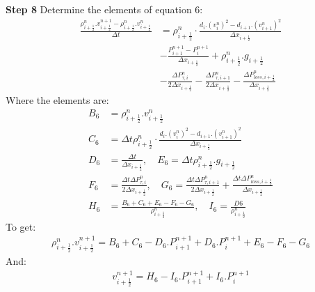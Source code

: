 \documentclass[11pt,letterpaper,titlepage]{article}
\newcommand{\half}{\frac{1}{2}}
\begin{document}
\newpage \noindent
\textbf{Step 8}\newline
Determine the elements of equation 6:
\begin{equation*}
\begin{aligned}
 \frac{\rho_{i+\half}^{n}.v_{i+\half}^{n+1}-\rho_{i+\half}^n.v_{i+\half}^n}{\Delta t} &= \rho_{i+\half}^n\cdot\frac{d_i.(v_{i}^n)^2-d_{i+1}.(v_{i+1}^n)^2}{\Delta x_{i+\half}}     \\
&-\frac{P_{i+1}^{n+1}-P_i^{n+1}}{\Delta x_{i+\half}} +\rho_{i+\half}^n.g_{i+\half} \\
&-\frac{\Delta P_{\tau,i}^n }{2\Delta x_{i+\half}}- \frac{\Delta P_{\tau,i+1}^n }{2\Delta x_{i+\half}} -\frac{\Delta P_{loss,i+\half}^n}{\Delta x_{i+\half}}
\end{aligned}
\end{equation*}
\newline
Where the elements are:
\begin{equation*}
\begin{aligned}
B_6&=\rho_{i+\half}^n.v_{i+\half}^n\\
C_6&=\Delta t\rho_{i+\half}^n\cdot\frac{d_i.(v_{i}^n)^2-d_{i+1}.(v_{i+1}^n)^2}{\Delta x_{i+\half}}\\
D_6&=\frac{\Delta t}{\Delta x_{i+\half}}, \quad E_6=\Delta t \rho_{i+\half}^n.g_{i+\half} \\
F_6&=\frac{\Delta t\Delta P_{\tau,i}^n }{2\Delta x_{i+\half}}, \quad G_6=\frac{\Delta t\Delta P_{\tau,i+1}^n }{2\Delta x_{i+\half}} +\frac{\Delta t\Delta P_{loss,i+\half}^n}{\Delta x_{i+\half}} \\
H_6&=\frac{B_6+C_6+E_6-F_6-G_6}{\rho_{i+\half}^{n}}, \quad I_6=\frac{D6}{\rho_{i+\half}^{n}}
\end{aligned}
\end{equation*}
\newline
To get:
\begin{equation*}
\begin{aligned}
\rho_{i+\half}^{n}.v_{i+\half}^{n+1}=B_6+C_6-D_6.P_{i+1}^{n+1}+D_6.P_{i}^{n+1}+E_6-F_6-G_6
\end{aligned}
\end{equation*}
And:
\begin{equation}
\begin{aligned}
v_{i+\half}^{n+1}=H_6-I_6.P_{i+1}^{n+1}+I_6.P_{i}^{n+1}
\end{aligned}
\end{equation}
\end{document}

